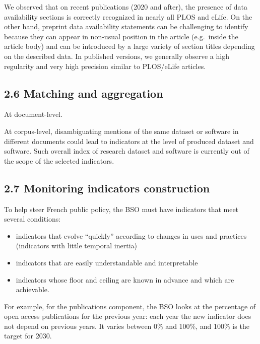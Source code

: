 \documentclass[
]{article}
\begin{document}
We observed that on recent publications (2020 and after), the presence
of data availability sections is correctly recognized in nearly all PLOS
and eLife. On the other hand, preprint data availability statements can
be challenging to identify because they can appear in non-usual position
in the article (e.g.~inside the article body) and can be introduced by a
large variety of section titles depending on the described data. In
published versions, we generally observe a high regularity and very high
precision similar to PLOS/eLife articles.

\hypertarget{matching-and-aggregation}{%
\subsection{2.6 Matching and
aggregation}\label{matching-and-aggregation}}

At document-level.

At corpus-level, disambiguating mentions of the same dataset or software
in different documents could lead to indicators at the level of produced
dataset and software. Such overall index of research dataset and
software is currently out of the scope of the selected indicators.

\hypertarget{monitoring-indicators-construction}{%
\subsection{2.7 Monitoring indicators
construction}\label{monitoring-indicators-construction}}

To help steer French public policy, the BSO must have indicators that
meet several conditions:

\begin{itemize}
\item
  indicators that evolve ``quickly'' according to changes in uses and
  practices (indicators with little temporal inertia)
\item
  indicators that are easily understandable and interpretable
\item
  indicators whose floor and ceiling are known in advance and which are
  achievable.
\end{itemize}

For example, for the publications component, the BSO looks at the
percentage of open access publications for the previous year: each year
the new indicator does not depend on previous years. It varies between
0\% and 100\%, and 100\% is the target for 2030.
\end{document}
